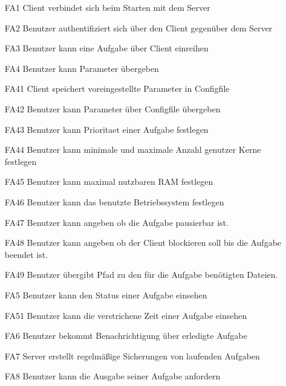 \documentclass[a4paper,12pt]{article}
\begin{document}
\begin{itemize}[nosep]
\leftskip=0.5cm

\item[FA1]	\gls{Client} verbindet sich beim Starten mit dem Server
\item[FA2] Benutzer authentifiziert sich über den \gls{Client} gegenüber dem Server
\item[FA3] Benutzer kann eine Aufgabe über \gls{Client} einreihen
\item[FA4] Benutzer kann Parameter übergeben %
\item[FA41]	\gls{Client} speichert voreingestellte Parameter in \gls{Configfile}
\item[FA42]	Benutzer kann Parameter über \gls{Configfile} übergeben
\item[FA43] Benutzer kann \gls{Prioritaet} einer Aufgabe festlegen %
\item[FA44] Benutzer kann minimale und maximale Anzahl genutzer Kerne festlegen %
\item[FA45] Benutzer kann maximal nutzbaren RAM festlegen %
\item[FA46] Benutzer kann das benutzte Betriebssystem festlegen
\item[FA47] Benutzer kann angeben ob die Aufgabe pausierbar ist. %
\item[FA48] Benutzer kann angeben ob der \gls{Client} blockieren soll bis die Aufgabe beendet ist. %
\item[FA49] Benutzer übergibt Pfad zu den für die Aufgabe benötigten Dateien. %
\item[FA5] Benutzer kann den Status einer Aufgabe einsehen
\item[FA51] Benutzer kann die verstrichene Zeit einer Aufgabe einsehen %
\item[FA6] Benutzer bekommt Benachrichtigung über erledigte Aufgabe
\item[FA7] Server erstellt regelmäßige Sicherungen von laufenden Aufgaben
\item[FA8] Benutzer kann die Ausgabe seiner Aufgabe anfordern
\end{itemize}



\end{document}
